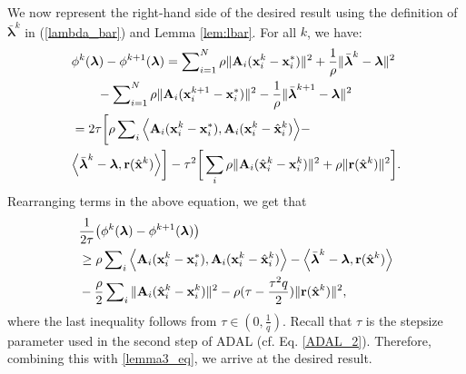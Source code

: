 \documentclass[doublecolumn]{IEEEtran}
\begin{document}
We now represent the right-hand side of the desired result using the definition of $\bar{\boldsymbol{\lambda}}^k$ in (\ref{lambda_bar}) and Lemma \ref{lem:lbar}. For all $k$,
we have:
\begin{align*}
& \phi^k({\boldsymbol{\lambda}}) - \phi^{k+1}({\boldsymbol{\lambda}})  =  \sum\nolimits_{i=1}^N {\rho}\|{ {\bf A} }_i({ {\bf x} }_i^k-{ {\bf x} }_i^*)\|^2 +\frac{1}{\rho}\|\bar{\boldsymbol{\lambda}}^k-{\boldsymbol{\lambda}}\|^2 \notag\\
& \qquad - \sum\nolimits_{i=1}^N {\rho}\|{ {\bf A} }_i({ {\bf x} }_i^{k+1}-{ {\bf x} }_i^*)\|^2 -\frac{1}{\rho}\|\bar{\boldsymbol{\lambda}}^{k+1}-{\boldsymbol{\lambda}}\|^2\notag\\
&=2\tau \bigg[ {\rho}\sum\nolimits_i\Big\langle { {\bf A} }_i( { {\bf x} }_i^k -{ {\bf x} }_i^*) , { {\bf A} }_i({ {\bf x} }_i^k-{\hat{\mathbf x}}_i^k) \Big\rangle - \notag\\
&  \Big\langle \bar{\boldsymbol{\lambda}}^k-{\boldsymbol{\lambda}} ,  { {\bf r} }({\hat{\mathbf x}}^k) \Big\rangle \bigg] - \tau^2 \bigg[\sum_i {\rho}\|{ {\bf A} }_i(\hat{ {\bf x} }_i^k-{ {\bf x} }_i^{k})\|^2 + {\rho}\| { {\bf r} }({\hat{\mathbf x}}^k) \|^2\bigg].\notag
\end{align*}
Rearranging terms in the above equation, we get that
\begin{align*}
&\frac{1}{2\tau}\big( \phi^k({\boldsymbol{\lambda}}) - \phi^{k+1}({\boldsymbol{\lambda}}) \big) \\
& \ge {\rho}\sum\nolimits_i\Big\langle { {\bf A} }_i( { {\bf x} }_i^k -{ {\bf x} }_i^*) , { {\bf A} }_i({ {\bf x} }_i^k-{\hat{\mathbf x}}_i^k) \Big\rangle -  \Big\langle \bar{\boldsymbol{\lambda}}^k-{\boldsymbol{\lambda}} ,  { {\bf r} }({\hat{\mathbf x}}^k) \Big\rangle \notag\\
&    - \frac{\rho}{2} \sum\nolimits_i \|{ {\bf A} }_i(\hat{ {\bf x} }_i^k-{ {\bf x} }_i^{k})\|^2 - \rho(\tau-\frac{\tau^2 q}{2})\| { {\bf r} }({\hat{\mathbf x}}^k) \|^2   ,\notag
\end{align*}
where the last inequality follows from  $\tau \in (0,\frac{1}{q})$. Recall that $\tau$ is the stepsize parameter used in the second step of ADAL (cf. Eq. \eqref{ADAL_2}). Therefore, combining this with \eqref{lemma3_eq}, we arrive at the desired result.
\end{document}
